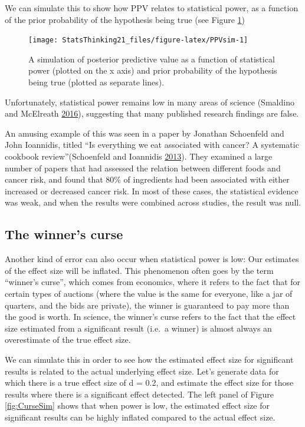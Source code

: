 \documentclass[12pt,]{book}
\theoremstyle{definition}
\theoremstyle{definition}
\theoremstyle{definition}
\theoremstyle{remark}
\begin{document}
We can simulate this to show how PPV relates to statistical power, as a function of the prior probability of the hypothesis being true (see Figure \ref{fig:PPVsim})

\begin{figure}
\texttt{[image: StatsThinking21\_files/figure-latex/PPVsim-1]} \caption{A simulation of posterior predictive value as a function of statistical power (plotted on the x axis) and prior probability of the hypothesis being true (plotted as separate lines).}\label{fig:PPVsim}
\end{figure}

Unfortunately, statistical power remains low in many areas of science (Smaldino and McElreath \protect\hyperlink{ref-smal:mcel:2016}{2016}), suggesting that many published research findings are false.

An amusing example of this was seen in a paper by Jonathan Schoenfeld and John Ioannidis, titled ``Is everything we eat associated with cancer? A systematic cookbook review''(Schoenfeld and Ioannidis \protect\hyperlink{ref-scho:ioan:2013}{2013}). They examined a large number of papers that had assessed the relation between different foods and cancer risk, and found that 80\% of ingredients had been associated with either increased or decreased cancer risk. In most of these cases, the statistical evidence was weak, and when the results were combined across studies, the result was null.

\hypertarget{the-winners-curse}{%
\subsection{The winner's curse}\label{the-winners-curse}}

Another kind of error can also occur when statistical power is low: Our estimates of the effect size will be inflated. This phenomenon often goes by the term ``winner's curse'', which comes from economics, where it refers to the fact that for certain types of auctions (where the value is the same for everyone, like a jar of quarters, and the bids are private), the winner is guaranteed to pay more than the good is worth. In science, the winner's curse refers to the fact that the effect size estimated from a significant result (i.e.~a winner) is almost always an overestimate of the true effect size.

We can simulate this in order to see how the estimated effect size for significant results is related to the actual underlying effect size. Let's generate data for which there is a true effect size of d = 0.2, and estimate the effect size for those results where there is a significant effect detected. The left panel of Figure \ref{fig:CurseSim} shows that when power is low, the estimated effect size for significant results can be highly inflated compared to the actual effect size.
\end{document}
